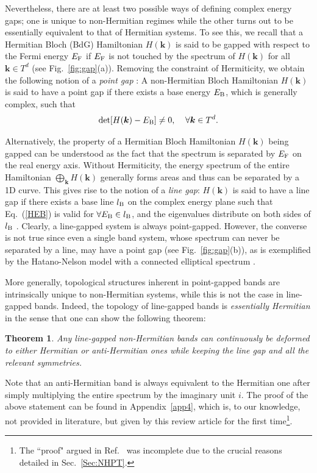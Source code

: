 \documentclass{tADP2e}
\theoremstyle{plain}
\theoremstyle{plain}
\newtheorem{theorem}{Theorem}[section]
\theoremstyle{definition}
\begin{document}
Nevertheless, there are at least two possible ways of defining complex energy gaps; one is unique to non-Hermitian regimes while the other turns out to be essentially equivalent to that of Hermitian systems. To see this, we recall that a Hermitian Bloch (BdG) Hamiltonian $H(\boldsymbol{k})$ is said to be gapped with respect to the Fermi energy $E_{\rm F}$ if $E_{\rm F}$ is not touched by the spectrum of $H(\boldsymbol{k})$ for all $\boldsymbol{k}\in T^d$ (see Fig.~\ref{fig:gap}(a)). Removing the constraint of Hermiticity, we obtain the following notion of a \emph{point gap} \cite{ZG18,ZH19}: A non-Hermitian Bloch Hamiltonian $H(\boldsymbol{k})$ is said to have a point gap if there exists a base energy $E_{\rm B}$, which is generally complex, such that
\begin{equation}
\det[H(\boldsymbol{k})-E_{\rm B}]\neq 0,\;\;\;\;\forall\boldsymbol{k}\in T^d.
\label{HEB}
\end{equation}

Alternatively, the property of a Hermitian Bloch Hamiltonian $H(\boldsymbol{k})$ being gapped can be understood as the fact that the spectrum is separated by $E_{\rm F}$ on the real energy axis. Without Hermiticity, the energy spectrum of the entire Hamiltonian $\bigoplus_{\boldsymbol{k}}H(\boldsymbol{k})$ generally forms areas and thus can be separated by a 1D curve. This gives rise to the notion of a \emph{line gap}: 
$H(\boldsymbol{k})$ is said to have a line gap if there exists a base line $l_{\rm B}$ on the complex energy plane such that  Eq.~(\ref{HEB}) is valid for $\forall E_{\rm B}\in l_{\rm B}$, and the eigenvalues distribute on both sides of $l_{\rm B}$ \cite{KK19c}. Clearly, a line-gapped system is always point-gapped. However, the converse is not true since even a single band system, whose spectrum can never be separated by a line, may have a point gap (see Fig.~\ref{fig:gap}(b)), as is exemplified by the Hatano-Nelson model with a connected elliptical spectrum \cite{HN96}. 

More generally, topological structures inherent in point-gapped bands are intrinsically unique to non-Hermitian systems, while this is not the case in line-gapped bands. Indeed, the topology of line-gapped bands is {\it essentially Hermitian} in the sense that one can show the following theorem:
\begin{theorem}\label{linedeform}
Any line-gapped non-Hermitian bands can continuously be deformed to either Hermitian or anti-Hermitian ones while keeping the line gap and all the  relevant symmetries. 
\end{theorem}
\noindent
Note that an anti-Hermitian band is always equivalent to the Hermitian one after simply multiplying the entire spectrum by the imaginary unit $i$. 
The proof of the above statement can be found in Appendix~\ref{app4}, which is, to our knowledge, not provided in literature, but given by this review article for the first time\footnote{The ``proof" argued in Ref.~\cite{KK19c} was incomplete due to the crucial reasons detailed in Sec.~\ref{Sec:NHPT}.}.
\end{document}
